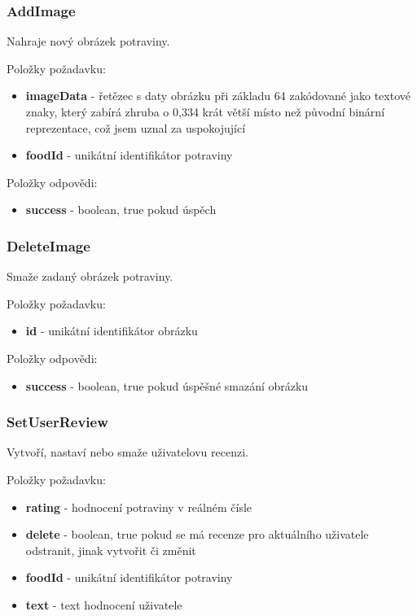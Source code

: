 \documentclass[thesis=B,czech]{FITthesis}[2013/10/20]
\begin{document}
\subsubsection{AddImage}
Nahraje nový obrázek potraviny.

Položky požadavku:
\begin{itemize}
  \item \textbf{imageData} - řetězec s daty obrázku při základu 64 zakódované jako textové znaky, který zabírá zhruba o 0,334 krát větší místo než původní binární reprezentace, což jsem uznal za uspokojující
  \item \textbf{foodId} - unikátní identifikátor potraviny
\end{itemize}

Položky odpovědi:
\begin{itemize}
  \item \textbf{success} - boolean, true pokud úspěch
\end{itemize}

\subsubsection{DeleteImage}
Smaže zadaný obrázek potraviny.

Položky požadavku:
\begin{itemize}
  \item \textbf{id} - unikátní identifikátor obrázku
\end{itemize}

Položky odpovědi:
\begin{itemize}
  \item \textbf{success} - boolean, true pokud úspěšné smazání obrázku
\end{itemize}

\subsubsection{SetUserReview}
Vytvoří, nastaví nebo smaže uživatelovu recenzi.

Položky požadavku:
\begin{itemize}
  \item \textbf{rating} - hodnocení potraviny v reálném čísle
  \item \textbf{delete} - boolean, true pokud se má recenze pro aktuálního uživatele odstranit, jinak vytvořit či změnit
  \item \textbf{foodId} - unikátní identifikátor potraviny
  \item \textbf{text} - text hodnocení uživatele
\end{itemize}
\end{document}
